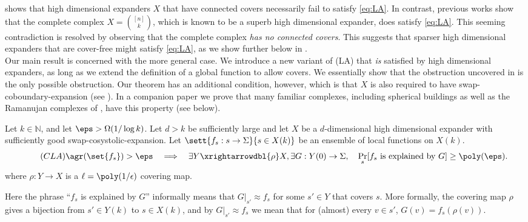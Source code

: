 \documentclass{article}[11pt]
\begin{document}
 shows that high dimensional expanders $X$ that have connected covers necessarily fail to satisfy \eqref{eq:LA}. In contrast, previous works \cite{DinurG2008, ImpagliazzoKW2012, DinurS14, DinurL2017} show that the complete complex $X = \binom{[n]}k$, which is known to be a superb high dimensional expander, does satisfy \eqref{eq:LA}. This seeming contradiction is resolved by observing that the complete complex \emph{has no connected covers}. This suggests that sparser high dimensional expanders that are cover-free might satisfy \eqref{eq:LA}, as we show further below in .
\\

Our main result is concerned with the more general case. We introduce a new variant of (LA) that {\em is} satisfied by high dimensional expanders, as long as we extend the definition of a global function to allow covers.  We essentially show that the obstruction uncovered in  is the only possible obstruction. Our theorem has an additional condition, however, which is that $X$ is also required to have swap-coboundary-expansion (see ). In a companion paper we prove that many familiar complexes, including spherical buildings as well as the Ramanujan complexes of \cite{LubotzkySV2005b}, have this property (see  below). 

\begin{theorem}\label{thm:abstract-general} Let $k\in \mathbb{N}$, and let $\eps >\Omega(1/\log k)$. Let $d>k$ be sufficiently large and let $X$ be a $d$-dimensional high dimensional expander with sufficiently good swap-cosystolic-expansion. 
    Let $\sett{f_s:s\to\Sigma}{s\in X(k)}$ be an ensemble of local functions on $X(k)$. 
\begin{equation}\label{eq:CLA}\tag{$CLA$}
    \agr (\set{f_s}) > \eps  \quad \Longrightarrow \quad \exists Y\xrightarrowdbl{\rho} X, \exists G:Y(0)\to\Sigma,\quad \Pr_s[f_s\hbox{ is explained by }G]\geq\poly(\eps).
\end{equation} 
where $\rho:Y\to X$ is a $\ell=\poly(1/\epsilon)$ covering map. 
\end{theorem}
Here the phrase ``$f_s$ is explained by $G$'' informally means that $G|_{s'}\approx f_s$ for some $s'\in Y$ that covers $s$. More formally, the covering map $\rho$ gives a bijection from $s'\in Y(k)$ to $s\in X(k)$, and by $G|_{s'}\approx f_s$ we mean that for (almost) every $v\in s'$, $G(v) = f_s(\rho(v))$. 
\end{document}
